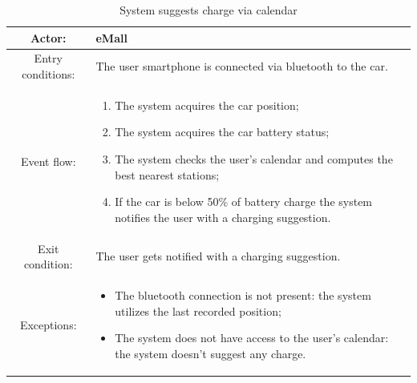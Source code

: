 \begin{table}[h]
    \begin{center}
        \begin{tabular}{|c||p{10cm}|}
            \hline
            Actor:            & eMall                                                       \\
            \hline
            Entry conditions: & The user smartphone is connected via bluetooth  to the car. \\
            \hline
            Event flow:       &
            \begin{enumerate}
                \item The system acquires the car position;
                \item The system acquires the car battery status;
                \item The system checks the user's calendar and computes the best nearest stations;
                \item If the car is below 50\% of battery charge the system notifies the user with a charging suggestion.
            \end{enumerate}
            \\
            \hline
            Exit condition:   & The user gets notified with a charging suggestion.          \\
            \hline
            Exceptions:       &
            \begin{itemize}
                \item The bluetooth connection is not present: the system utilizes the last recorded position;
                \item The system does not have access to the user's calendar: the system doesn't suggest any charge.
            \end{itemize}
            \\
            \hline
        \end{tabular}
    \end{center}
    \caption{System suggests charge via calendar}
\end{table}

